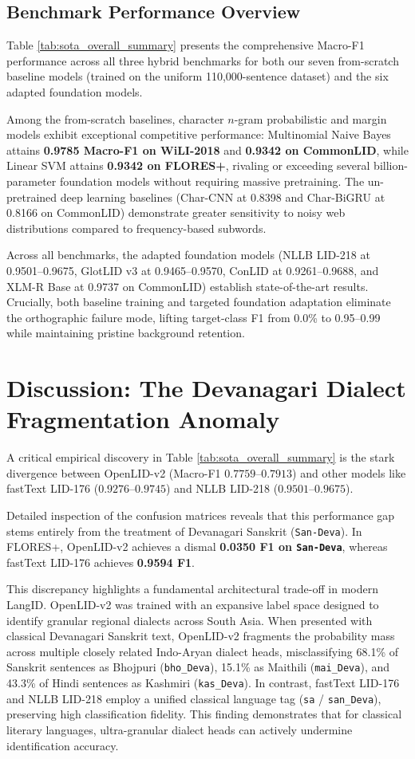 \documentclass[11pt]{article}
\begin{document}
\subsection{Benchmark Performance Overview}
Table \ref{tab:sota_overall_summary} presents the comprehensive Macro-F1 performance across all three hybrid benchmarks for both our seven from-scratch baseline models (trained on the uniform 110,000-sentence dataset) and the six adapted foundation models. 

Among the from-scratch baselines, character $n$-gram probabilistic and margin models exhibit exceptional competitive performance: Multinomial Naive Bayes attains \textbf{0.9785 Macro-F1 on WiLI-2018} and \textbf{0.9342 on CommonLID}, while Linear SVM attains \textbf{0.9342 on FLORES+}, rivaling or exceeding several billion-parameter foundation models without requiring massive pretraining. The un-pretrained deep learning baselines (Char-CNN at 0.8398 and Char-BiGRU at 0.8166 on CommonLID) demonstrate greater sensitivity to noisy web distributions compared to frequency-based subwords.

Across all benchmarks, the adapted foundation models (NLLB LID-218 at 0.9501--0.9675, GlotLID v3 at 0.9465--0.9570, ConLID at 0.9261--0.9688, and XLM-R Base at 0.9737 on CommonLID) establish state-of-the-art results. Crucially, both baseline training and targeted foundation adaptation eliminate the orthographic failure mode, lifting target-class F1 from 0.0\% to 0.95--0.99 while maintaining pristine background retention.

\section{Discussion: The Devanagari Dialect Fragmentation Anomaly}

A critical empirical discovery in Table \ref{tab:sota_overall_summary} is the stark divergence between OpenLID-v2 (Macro-F1 $0.7759$--$0.7913$) and other models like fastText LID-176 ($0.9276$--$0.9745$) and NLLB LID-218 ($0.9501$--$0.9675$).

Detailed inspection of the confusion matrices reveals that this performance gap stems entirely from the treatment of Devanagari Sanskrit (\texttt{San-Deva}). In FLORES+, OpenLID-v2 achieves a dismal \textbf{0.0350 F1 on \texttt{San-Deva}}, whereas fastText LID-176 achieves \textbf{0.9594 F1}.

This discrepancy highlights a fundamental architectural trade-off in modern LangID. OpenLID-v2 was trained with an expansive label space designed to identify granular regional dialects across South Asia. When presented with classical Devanagari Sanskrit text, OpenLID-v2 fragments the probability mass across multiple closely related Indo-Aryan dialect heads, misclassifying 68.1\% of Sanskrit sentences as Bhojpuri (\texttt{bho\_Deva}), 15.1\% as Maithili (\texttt{mai\_Deva}), and 43.3\% of Hindi sentences as Kashmiri (\texttt{kas\_Deva}). In contrast, fastText LID-176 and NLLB LID-218 employ a unified classical language tag (\texttt{sa} / \texttt{san\_Deva}), preserving high classification fidelity. This finding demonstrates that for classical literary languages, ultra-granular dialect heads can actively undermine identification accuracy.
\end{document}
